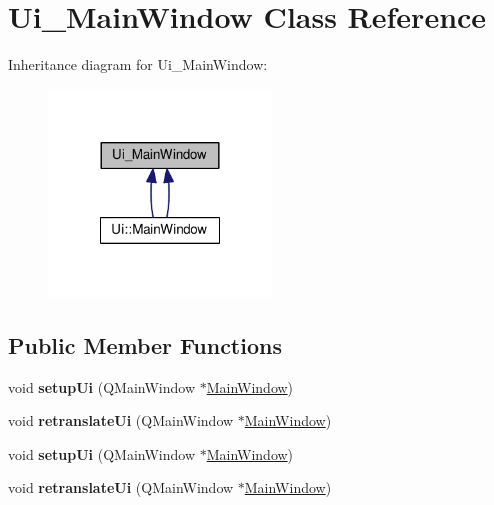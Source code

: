 \hypertarget{class_ui___main_window}{\section{Ui\-\_\-\-Main\-Window Class Reference}
\label{class_ui___main_window}
}


Inheritance diagram for Ui\-\_\-\-Main\-Window\-:
\nopagebreak
\begin{figure}[H]
\begin{center}
\leavevmode
\includegraphics[width=168pt]{class_ui___main_window__inherit__graph}
\end{center}
\end{figure}
\subsection*{Public Member Functions}
\begin{DoxyCompactItemize}
\item 
\hypertarget{class_ui___main_window_acf4a0872c4c77d8f43a2ec66ed849b58}{void {\bfseries setup\-Ui} (Q\-Main\-Window $\ast$\hyperlink{class_main_window}{Main\-Window})}\label{class_ui___main_window_acf4a0872c4c77d8f43a2ec66ed849b58}

\item 
\hypertarget{class_ui___main_window_a097dd160c3534a204904cb374412c618}{void {\bfseries retranslate\-Ui} (Q\-Main\-Window $\ast$\hyperlink{class_main_window}{Main\-Window})}\label{class_ui___main_window_a097dd160c3534a204904cb374412c618}

\item 
\hypertarget{class_ui___main_window_acf4a0872c4c77d8f43a2ec66ed849b58}{void {\bfseries setup\-Ui} (Q\-Main\-Window $\ast$\hyperlink{class_main_window}{Main\-Window})}\label{class_ui___main_window_acf4a0872c4c77d8f43a2ec66ed849b58}

\item 
\hypertarget{class_ui___main_window_a097dd160c3534a204904cb374412c618}{void {\bfseries retranslate\-Ui} (Q\-Main\-Window $\ast$\hyperlink{class_main_window}{Main\-Window})}\label{class_ui___main_window_a097dd160c3534a204904cb374412c618}

\end{DoxyCompactItemize}
